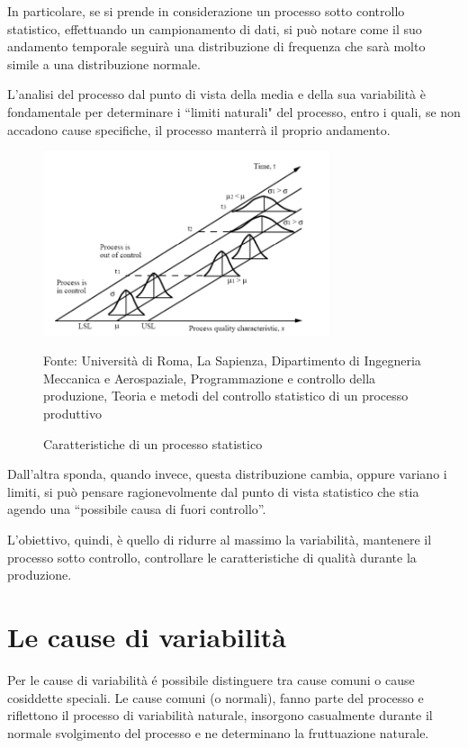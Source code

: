 In particolare, se si prende in considerazione un processo sotto controllo statistico, effettuando un campionamento di dati, si può notare come il suo andamento temporale seguirà una distribuzione di frequenza che sarà molto simile a una distribuzione normale.


L'analisi del processo dal punto di vista della media e della sua variabilità è fondamentale per determinare i ``limiti naturali" del processo, entro i quali, se non accadono cause specifiche, il processo
manterrà il proprio andamento.
\cite{Joseph}


\begin{figure}[H]
  \centering
  \includegraphics[width=0.75\textwidth]{img/process-quality-char.png}
  \caption{Caratteristiche di un processo statistico} 
  Fonte: Università di Roma, La Sapienza, Dipartimento di Ingegneria Meccanica e Aerospaziale, Programmazione e controllo della produzione, Teoria e metodi del controllo statistico di un processo produttivo
  \label{fig:process-quality-char.png}
\end{figure}

Dall'altra sponda, quando invece, questa distribuzione cambia, oppure variano i limiti, si può pensare ragionevolmente dal punto di vista statistico che stia agendo una ``possibile causa di fuori controllo''.

L'obiettivo, quindi, è quello di ridurre al massimo la variabilità, mantenere il processo sotto controllo, controllare le caratteristiche di qualità durante la produzione. 
\cite{qualityi}
\cite{ManagementAcademy}


\section{Le cause di variabilità}
Per le cause di variabilità é possibile distinguere tra cause comuni o cause cosiddette speciali.
Le cause comuni (o normali), fanno parte del processo e riflettono il processo di variabilità naturale, insorgono casualmente durante il normale svolgimento del processo e ne determinano la fruttuazione naturale.

